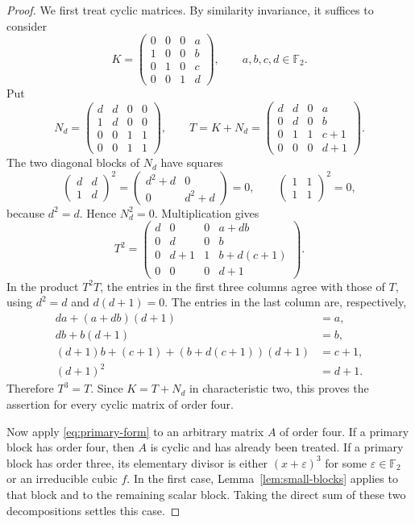 \documentclass[12pt]{amsart}
\theoremstyle{remark}
\numberwithin{equation}{section}
\theoremstyle{definition}
\newcommand{\F}{\mathbb F}
\begin{document}
\begin{proof}
We first treat cyclic matrices. By similarity invariance, it suffices to consider
\[
 K=\begin{pmatrix}
 0&0&0&a\\
 1&0&0&b\\
 0&1&0&c\\
 0&0&1&d
 \end{pmatrix},\qquad a,b,c,d\in\F_2.
\]
Put
\[
 N_d=\begin{pmatrix}
 d&d&0&0\\
 1&d&0&0\\
 0&0&1&1\\
 0&0&1&1
 \end{pmatrix},\qquad
 T=K+N_d=
 \begin{pmatrix}
 d&d&0&a\\
 0&d&0&b\\
 0&1&1&c+1\\
 0&0&0&d+1
 \end{pmatrix}.
\]
The two diagonal blocks of $N_d$ have squares
\[
 \begin{pmatrix}d&d\\1&d\end{pmatrix}^{\!2}
 =\begin{pmatrix}d^2+d&0\\0&d^2+d\end{pmatrix}=0,
 \qquad
 \begin{pmatrix}1&1\\1&1\end{pmatrix}^{\!2}=0,
\]
because $d^2=d$. Hence $N_d^2=0$. Multiplication gives
\[
 T^2=\begin{pmatrix}
 d&0&0&a+db\\
 0&d&0&b\\
 0&d+1&1&b+d(c+1)\\
 0&0&0&d+1
 \end{pmatrix}.
\]
In the product $T^2T$, the entries in the first three columns agree with those of $T$, using $d^2=d$ and $d(d+1)=0$. The entries in the last column are, respectively,
\begin{align*}
 da+(a+db)(d+1)&=a,\\
 db+b(d+1)&=b,\\
 (d+1)b+(c+1)+(b+d(c+1))(d+1)&=c+1,\\
 (d+1)^2&=d+1.
\end{align*}
Therefore $T^3=T$. Since $K=T+N_d$ in characteristic two, this proves the assertion for every cyclic matrix of order four.

Now apply \eqref{eq:primary-form} to an arbitrary matrix $A$ of order four. If a primary block has order four, then $A$ is cyclic and has already been treated. If a primary block has order three, its elementary divisor is either $(x+\varepsilon)^3$ for some $\varepsilon\in\F_2$ or an irreducible cubic $f$. In the first case, Lemma~\ref{lem:small-blocks} applies to that block and to the remaining scalar block. Taking the direct sum of these two decompositions settles this case.


\end{proof}
\end{document}
